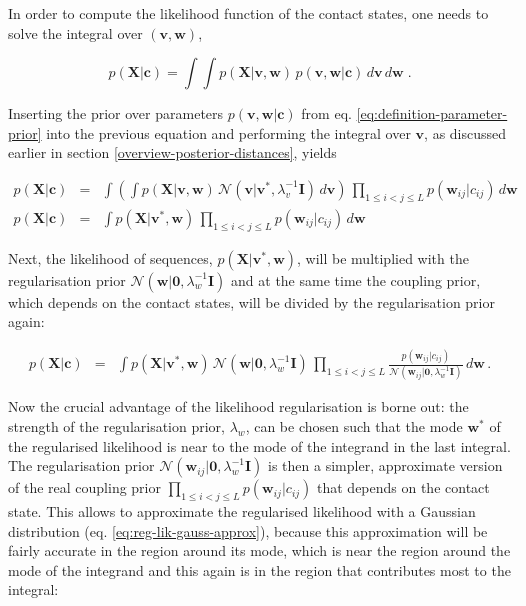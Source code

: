 \documentclass[11pt,a4paper,twoside]{book}
\newcommand{\Gauss}{\mathcal{N}}
\newcommand{\I}{\mathbf{I}}
\renewcommand{\c}{\mathbf{c}}
\newcommand{\cij}{c_{ij}}
\renewcommand{\v}{\mathbf{v}}
\newcommand{\w}{\mathbf{w}}
\newcommand{\wij}{\mathbf{w}_{ij}}
\newcommand{\X}{\mathbf{X}}
\theoremstyle{definition}
\theoremstyle{definition}
\theoremstyle{remark}
\begin{document}
In order to compute the likelihood function of the contact states, one
needs to solve the integral over \((\v, \w)\),

\begin{equation}
    p(\X | \c) = \int \int p(\X | \v,\w) \, p(\v, \w | \c) \,d\v\,d\w \; .
\label{eq:likelihood-distances}
\end{equation}

Inserting the prior over parameters \(p(\v, \w | \c)\) from eq.
\eqref{eq:definition-parameter-prior} into the previous equation and
performing the integral over \(\v\), as discussed earlier in section
\ref{overview-posterior-distances}, yields

\begin{eqnarray}
    p(\X | \c) &=& \int \left( \int  p(\X | \v,\w) \, \Gauss(\v|\v^*,\lambda_v^{-1} \I) \,d\v \right) \, \prod_{1\le i<j\le L} p(\wij|\cij) \, d\w  \\
    p(\X | \c) &=& \int  p(\X | \v^*,\w) \, \prod_{1\le i<j\le L} p(\wij|\cij) \, d\w  
\label{eq:in_over_w_1}
\end{eqnarray}

Next, the likelihood of sequences, \(p(\X | \v^*,\w)\), will be
multiplied with the regularisation prior
\(\Gauss(\w|\mathbf{0}, \lambda_w^{-1} \I)\) and at the same time the
coupling prior, which depends on the contact states, will be divided by
the regularisation prior again:

\begin{eqnarray}
      p(\X | \c) &=& \int p(\X | \v^*,\w) \, \Gauss(\w|\mathbf{0}, \lambda_w^{-1} \I) \, \prod_{1\le i<j\le L} \frac{p(\wij|\cij)}{\Gauss(\wij|\mathbf{0}, \lambda_w^{-1} \I)} \,d\w \, .
\end{eqnarray}

Now the crucial advantage of the likelihood regularisation is borne out:
the strength of the regularisation prior, \(\lambda_w\), can be chosen
such that the mode \(\w^*\) of the regularised likelihood is near to the
mode of the integrand in the last integral. The regularisation prior
\(\Gauss(\wij|\mathbf{0}, \lambda_w^{-1} \I)\) is then a simpler,
approximate version of the real coupling prior
\(\prod_{1\le i<j\le L} p(\wij|\cij)\) that depends on the contact
state. This allows to approximate the regularised likelihood with a
Gaussian distribution (eq. \eqref{eq:reg-lik-gauss-approx}), because this
approximation will be fairly accurate in the region around its mode,
which is near the region around the mode of the integrand and this again
is in the region that contributes most to the integral:
\end{document}
